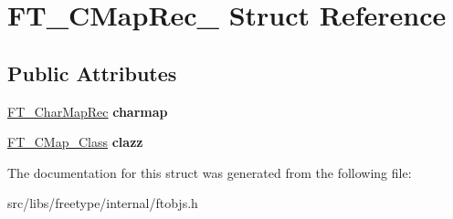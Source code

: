 \hypertarget{struct_f_t___c_map_rec__}{
\section{FT\_\-CMapRec\_\- Struct Reference}
\label{struct_f_t___c_map_rec__}
}
\subsection*{Public Attributes}
\begin{DoxyCompactItemize}
\item 
\hypertarget{struct_f_t___c_map_rec___a39fa6de9995d4ae4496b93e2b874b34e}{
\hyperlink{struct_f_t___char_map_rec__}{FT\_\-CharMapRec} {\bfseries charmap}}
\label{struct_f_t___c_map_rec___a39fa6de9995d4ae4496b93e2b874b34e}

\item 
\hypertarget{struct_f_t___c_map_rec___aa85db42650df0edb38f8af5887c0ac6a}{
\hyperlink{struct_f_t___c_map___class_rec__}{FT\_\-CMap\_\-Class} {\bfseries clazz}}
\label{struct_f_t___c_map_rec___aa85db42650df0edb38f8af5887c0ac6a}

\end{DoxyCompactItemize}


The documentation for this struct was generated from the following file:\begin{DoxyCompactItemize}
\item 
src/libs/freetype/internal/ftobjs.h\end{DoxyCompactItemize}
